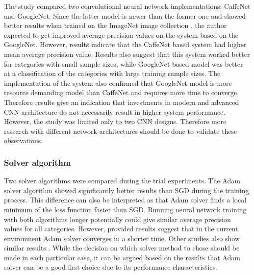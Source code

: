The study compared two convolutional neural network implementations: CaffeNet and GoogleNet. Since the latter model is newer than the former one and showed better results when trained on the ImageNet image collection \cite{Szegedy2015GoingDeeper}, the author expected to get improved average precision values on the system based on the GoogleNet. However, results indicate that the CaffeNet based system had higher mean average precision value. Results also suggest that this system worked better for categories with small sample sizes, while GoogleNet based model was better at a classification of the categories with large training sample sizes. The implementation of the system also confirmed that GoogleNet model is more resource demanding model than CaffeNet and requires more time to converge. Therefore results give an indication that investments in modern and advanced CNN architecture do not necessarily result in higher system performance. However, the study was limited only to two CNN designs. Therefore more research with different network architectures should be done to validate these observations.


\subsubsection{Solver algorithm}
Two solver algorithms were compared during the trial experiments. The Adam solver algorithm showed significantly better results than SGD during the training process. This difference can also be interpreted as that Adam solver finds a local minimum of the loss function faster than SGD. Running neural network training with both algorithms longer potentially could give similar average precision values for all categories. However, provided results suggest that in the current environment Adam solver converges in a shorter time. Other studies also show similar results \cite{adam}. While the decision on which solver method to chose should be made in each particular case, it can be argued based on the results that Adam solver can be a good first choice due to its performance characteristics.

